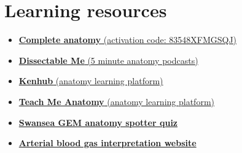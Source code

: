 \section{Learning resources}
\label{sec:learning_resources}
\begin{itemize}
    \item \href{https://3d4medical.com/}{\textbf{Complete anatomy} (activation code: 83548XFMGSQJ)}
    \item \href{https://dissectibleme.podbean.com/}{\textbf{Dissectable Me} (5 minute anatomy podcasts)}
    \item \href{https://www.kenhub.com/}{\textbf{Kenhub} (anatomy learning platform)}
    \item \href{https://teachmeanatomy.info/}{\textbf{Teach Me Anatomy} (anatomy learning platform)}
    \item \href{https://rhodridavies7.github.io/swansea-gem-anatomy/spotter.html}{\textbf{Swansea GEM anatomy spotter quiz}}
    \item \href{https://abg.ninja/abg}{\textbf{Arterial blood gas interpretation website}}
\end{itemize}


